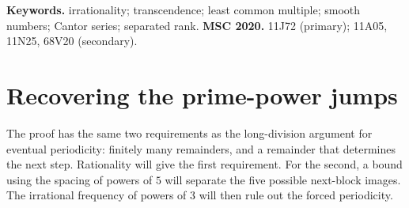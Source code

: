 \documentclass[11pt]{article}
\theoremstyle{remark}
\theoremstyle{plain}
\begin{document}
\medskip
\noindent\textbf{Keywords.} irrationality; transcendence; least common
multiple; smooth numbers; Cantor series; separated rank.
\qquad\textbf{MSC 2020.} 11J72 (primary); 11A05, 11N25, 68V20 (secondary).

\section{Recovering the prime-power jumps}\label{long269:sec:distinct-235}
The proof has the same two requirements as the long-division argument
for eventual periodicity: finitely many remainders, and a remainder that
determines the next step. Rationality will give the first requirement.
For the second, a bound using the spacing of powers of $5$ will separate
the five possible next-block images. The irrational frequency of powers
of $3$ will then rule out the forced periodicity.
\end{document}
